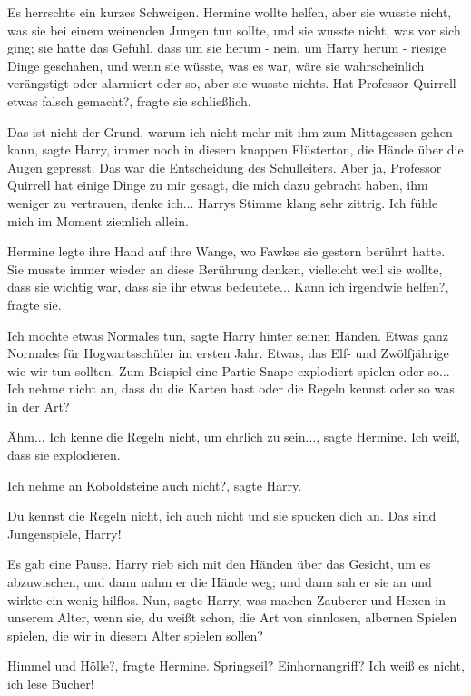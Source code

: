 Es herrschte ein kurzes Schweigen. Hermine wollte helfen, aber sie wusste nicht,
was sie bei einem weinenden Jungen tun sollte, und sie wusste nicht, was vor
sich ging; sie hatte das Gefühl, dass um sie herum - nein, um Harry herum -
riesige Dinge geschahen, und wenn sie wüsste, was es war, wäre sie
wahrscheinlich verängstigt oder alarmiert oder so, aber sie wusste nichts. \glqq
Hat Professor Quirrell etwas falsch gemacht?\grqq{}, fragte sie schließlich.

\glqq{}Das ist nicht der Grund, warum ich nicht mehr mit ihm zum Mittagessen
gehen kann\grqq{}, sagte Harry, immer noch in diesem knappen Flüsterton, die
Hände über die Augen gepresst. \glqq{}Das war die Entscheidung des Schulleiters.
Aber ja, Professor Quirrell hat einige Dinge zu mir gesagt, die mich dazu
gebracht haben, ihm weniger zu vertrauen, denke ich...\grqq{} Harrys Stimme
klang sehr zittrig. \glqq{}Ich fühle mich im Moment ziemlich allein.\grqq{}

Hermine legte ihre Hand auf ihre Wange, wo Fawkes sie gestern berührt hatte. Sie
musste immer wieder an diese Berührung denken, vielleicht weil sie wollte, dass
sie wichtig war, dass sie ihr etwas bedeutete... \glqq{}Kann ich irgendwie
helfen?\grqq{}, fragte sie.

\glqq{}Ich möchte etwas Normales tun\grqq{}, sagte Harry hinter seinen Händen.
\glqq{}Etwas ganz Normales für Hogwartsschüler im ersten Jahr. Etwas, das Elf-
und Zwölfjährige wie wir tun sollten. Zum Beispiel eine Partie Snape explodiert
spielen oder so... Ich nehme nicht an, dass du die Karten hast oder die Regeln
kennst oder so was in der Art?\grqq{}

\glqq{}Ähm... Ich kenne die Regeln nicht, um ehrlich zu sein...\grqq{}, sagte
Hermine. \glqq{}Ich weiß, dass sie explodieren.\grqq{}

\glqq{}Ich nehme an Koboldsteine auch nicht?\grqq{}, sagte Harry.

\glqq{}Du kennst die Regeln nicht, ich auch nicht und sie spucken dich an. Das
sind Jungenspiele, Harry!\grqq{}

Es gab eine Pause. Harry rieb sich mit den Händen über das Gesicht, um es
abzuwischen, und dann nahm er die Hände weg; und dann sah er sie an und wirkte
ein wenig hilflos. \glqq{}Nun\grqq{}, sagte Harry, \glqq{}was machen Zauberer und
Hexen in unserem Alter, wenn sie, du weißt schon, die Art von sinnlosen,
albernen Spielen spielen, die wir in diesem Alter spielen sollen?\grqq{}

\glqq{}Himmel und Hölle?\grqq{}, fragte Hermine. \glqq{}Springseil?
Einhornangriff? Ich weiß es nicht, ich lese Bücher!\grqq{}

